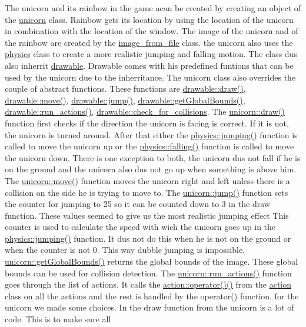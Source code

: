 The unicorn and it\textquotesingle{}s rainbow in the game acan be created by creating an object of the \hyperlink{classunicorn}{unicorn} class. Rainbow get\textquotesingle{}s it\textquotesingle{}s location by using the location of the unicorn in combination with the location of the window. The image of the unicorn and of the rainbow are created by the \hyperlink{classimage__from__file}{image\+\_\+from\+\_\+file} class. the unicorn also uses the \hyperlink{classphysics}{physics} class to create a more realistic jumping and falling motion. The class dus also inherrit \hyperlink{classdrawable}{drawable}. Drawable comes with his predefined funtions that can be used by the unicorn due to the inherritance. The unicorn class also overrides the couple of abstract functions. These functions are \hyperlink{classdrawable_a4e49e2c1121704c83ce24c5f48dd910f}{drawable\+::draw()}, \hyperlink{classdrawable_ad0d3930c045cc6776aa2c3965be32491}{drawable\+::move()}, \hyperlink{classdrawable_ac39691470b7874f5dec59efe649d3981}{drawable\+::jump()}, \hyperlink{classdrawable_ae013ac0be47538be9ce885d6642daf73}{drawable\+::get\+Global\+Bounds()}, \hyperlink{classdrawable_a715df01a318331e5611a2b0ad30109ff}{drawable\+::run\+\_\+actions()}, \hyperlink{classdrawable_abbc6e0089d502ba48c3fcb9c96e3966e}{drawable\+::check\+\_\+for\+\_\+collisions}. The \hyperlink{classunicorn_a570c34d5669a8d2a61bdc1481e6f9dee}{unicorn\+::draw()} function first checks if the direction the unicorn is facing is correct. If it is not, the unicorn is turned around. After that either the \hyperlink{classphysics_aaf1c57aa6e35b9c83ccbfdfa8c18468c}{physics\+::jumping()} function is called to move the unicorn up or the \hyperlink{classphysics_acca1ee2fb8b760b6e4ee61ae7c2ee3da}{physics\+::falling()} function is called to move the unicorn down. There is one exception to both, the unicorn dus not fall if he is on the ground and the unicorn also dus not go up when something is above him. The \hyperlink{classunicorn_a162f200a68342f7bc0baaf17c8cf3f9f}{unicorn\+::move()} function moves the unicorn right and left unless there is a collision on the side he is trying to move to. The \hyperlink{classunicorn_a07d5ca4e66632c0e871221a27146805a}{unicorn\+::jump()} function sets the counter for jumping to 25 so it can be counted down to 3 in the draw function. These values seemed to give us the most realistic jumping effect This counter is used to calculate the speed with wich the unicorn goes up in the \hyperlink{classphysics_aaf1c57aa6e35b9c83ccbfdfa8c18468c}{physics\+::jumping()} function. It dus not do this when he is not on the ground or when the counter is not 0. This way dubble jumping is impossible. \hyperlink{classunicorn_a1bac09fc59b04f14f5a093bc4daa04da}{unicorn\+::get\+Global\+Bounds()} returns the global bounds of the image. These global bounds can be used for collision detection. The \hyperlink{classunicorn_aadb47a9981c46d6add8704074df117df}{unicorn\+::run\+\_\+actions()} function goes through the list of actions. It calls the \hyperlink{classaction_a92c003677656b5b3e6e58b19376e6b04}{action\+::operator()()} from the \hyperlink{classaction}{action} class on all the actions and the rest is handled by the operator() function. for the unicorn we made some choices. In the draw function from the unicorn is a lot of code. This is to make sure all 